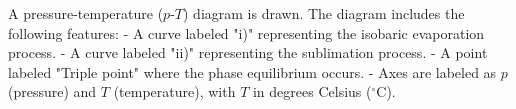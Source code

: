 A pressure-temperature (\( p \)-\( T \)) diagram is drawn. The diagram includes the following features:  
- A curve labeled "i)" representing the isobaric evaporation process.  
- A curve labeled "ii)" representing the sublimation process.  
- A point labeled "Triple point" where the phase equilibrium occurs.  
- Axes are labeled as \( p \) (pressure) and \( T \) (temperature), with \( T \) in degrees Celsius (\( ^\circ\text{C} \)).